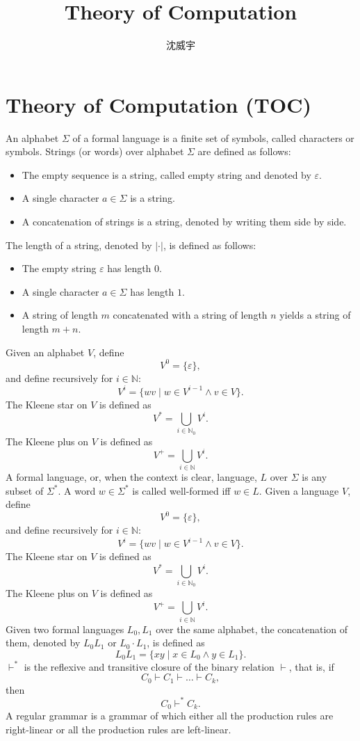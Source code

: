 \documentclass[a4paper,12pt]{article}
\begin{document}
\title{Theory of Computation}
\author{沈威宇}
\date{\temtoday}
\titletocdoc
\section{Theory of Computation (TOC)}
An alphabet $\Sigma$ of a formal language is a finite set of symbols, called characters or symbols.
Strings (or words) over alphabet $\Sigma$ are defined as follows:
\begin{itemize}
\item The empty sequence is a string, called empty string and denoted by $\varepsilon$.
\item A single character $a\in\Sigma$ is a string.
\item A concatenation of strings is a string, denoted by writing them side by side.
\end{itemize}
The length of a string, denoted by $|\cdot|$, is defined as follows:
\begin{itemize}
\item The empty string $\varepsilon$ has length $0$.
\item A single character $a\in\Sigma$ has length $1$.
\item A string of length $m$ concatenated with a string of length $n$ yields a string of length $m+n$.
\end{itemize}
Given an alphabet $V$, define
\[V^0 = \{\varepsilon\},\]
and define recursively for $i\in\mathbb{N}$:
\[V^i = \{wv \mid w\in V^{i-1} \land v\in V \}.\]
The Kleene star on $V$ is defined as
\[V^* = \bigcup_{i\in\mathbb{N}_0} V^i.\]
The Kleene plus on $V$ is defined as
\[V^+ = \bigcup_{i\in\mathbb{N}} V^i.\]
A formal language, or, when the context is clear, language, $L$ over $\Sigma$ is any subset of $\Sigma^*$. A word $w\in\Sigma^*$ is called well-formed iff $w\in L$.
Given a language $V$, define
\[V^0 = \{\varepsilon\},\]
and define recursively for $i\in\mathbb{N}$:
\[V^i = \{wv \mid w\in V^{i-1} \land v\in V \}.\]
The Kleene star on $V$ is defined as
\[V^* = \bigcup_{i\in\mathbb{N}_0} V^i.\]
The Kleene plus on $V$ is defined as
\[V^+ = \bigcup_{i\in\mathbb{N}} V^i.\]
Given two formal languages $L_0,L_1$ over the same alphabet, the concatenation of them, denoted by $L_0L_1$ or $L_0\cdot L_1$, is defined as
\[L_0L_1=\{xy\mid x\in L_0\land y\in L_1\}.\]
$\vdash^*$ is the reflexive and transitive closure of the binary relation $\vdash$, that is, if
\[C_0\vdash C_1\vdash\ldots\vdash C_k,\]
then
\[C_0\vdash^*C_k.\]
A regular grammar is a grammar of which either all the production rules are right-linear or all the production rules are left-linear.
\end{document}
